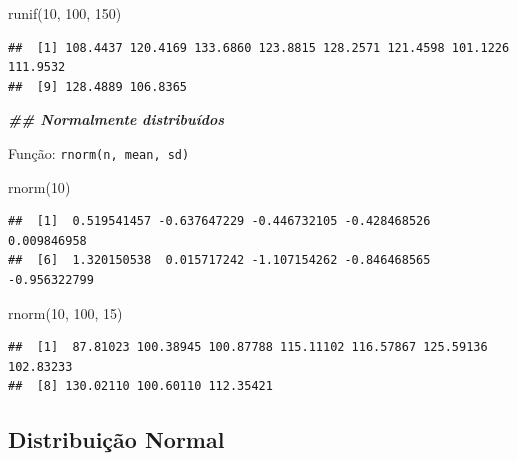 \documentclass[
]{article}
\newenvironment{Shaded}{\begin{snugshade}}{\end{snugshade}}
\newcommand{\DecValTok}[1]{\textcolor[rgb]{0.00,0.00,0.81}{#1}}
\newcommand{\DocumentationTok}[1]{\textcolor[rgb]{0.56,0.35,0.01}{\textbf{\textit{#1}}}}
\newcommand{\FunctionTok}[1]{\textcolor[rgb]{0.00,0.00,0.00}{#1}}
\newcommand{\NormalTok}[1]{#1}
\begin{document}
\begin{Shaded}
\begin{Highlighting}[]
\FunctionTok{runif}\NormalTok{(}\DecValTok{10}\NormalTok{, }\DecValTok{100}\NormalTok{, }\DecValTok{150}\NormalTok{)}
\end{Highlighting}
\end{Shaded}

\begin{verbatim}
##  [1] 108.4437 120.4169 133.6860 123.8815 128.2571 121.4598 101.1226 111.9532
##  [9] 128.4889 106.8365
\end{verbatim}

\begin{Shaded}
\begin{Highlighting}[]
\DocumentationTok{\#\# Normalmente distribuídos}
\end{Highlighting}
\end{Shaded}

Função: \texttt{rnorm(n,\ mean,\ sd)}

\begin{Shaded}
\begin{Highlighting}[]
\FunctionTok{rnorm}\NormalTok{(}\DecValTok{10}\NormalTok{)}
\end{Highlighting}
\end{Shaded}

\begin{verbatim}
##  [1]  0.519541457 -0.637647229 -0.446732105 -0.428468526  0.009846958
##  [6]  1.320150538  0.015717242 -1.107154262 -0.846468565 -0.956322799
\end{verbatim}

\begin{Shaded}
\begin{Highlighting}[]
\FunctionTok{rnorm}\NormalTok{(}\DecValTok{10}\NormalTok{, }\DecValTok{100}\NormalTok{, }\DecValTok{15}\NormalTok{)}
\end{Highlighting}
\end{Shaded}

\begin{verbatim}
##  [1]  87.81023 100.38945 100.87788 115.11102 116.57867 125.59136 102.83233
##  [8] 130.02110 100.60110 112.35421
\end{verbatim}

\hypertarget{distribuiuxe7uxe3o-normal}{%
\subsection{Distribuição Normal}\label{distribuiuxe7uxe3o-normal}}
\end{document}
